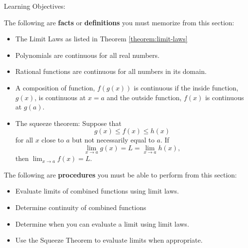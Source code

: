 \documentclass{ximera}
\begin{document}
Learning Objectives:

The following are \textbf{facts} or \textbf{definitions} you must memorize from this section:
\begin{itemize}
\item The Limit Laws as listed in Theorem \ref{theorem:limit-laws} 
\item Polynomials are continuous for all real numbers.
\item Rational functions are continuous for all numbers in its domain.
\item A composition of function, $f(g(x))$ is continuous if the inside function, $g(x)$, is continuous at $x=a$ and the outside function, $f(x)$ is continuous at $g(a)$. 
\item The squeeze theorem: Suppose that
  \[
  g(x) \le f(x) \le h(x)
  \]
  for all $x$ close to $a$ but not necessarily equal to $a$. If
  \[
  \lim_{x\to a} g(x) = L = \lim_{x\to a} h(x),
  \]
  then $\lim_{x\to a} f(x) = L$.
\end{itemize}


The following are \textbf{procedures} you must be able to perform from this section:
\begin{itemize}
\item Evaluate limits of combined functions using limit laws. 
\item Determine continuity of combined functions
\item Determine when you can evaluate a limit using limit laws.
\item Use the Squeeze Theorem to evaluate limits when appropriate.

\end{itemize}
\end{document}
